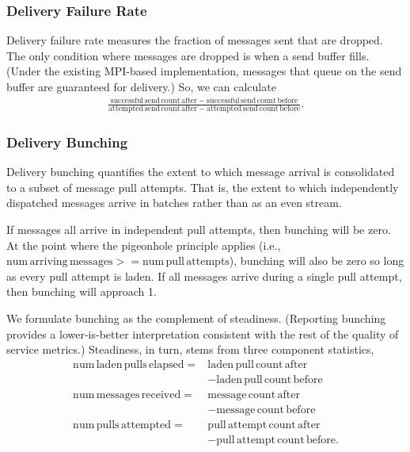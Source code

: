 
\subsubsection{Delivery Failure Rate} \label{moreno:sec:delivery-failure-rate-metric}

Delivery failure rate measures the fraction of messages sent that are dropped.
The only condition where messages are dropped is when a send buffer fills.
(Under the existing MPI-based implementation, messages that queue on the send buffer are guaranteed for delivery.)
So, we can calculate
\begin{align*}
  \frac{
    \mathrm{successful\,send\,count\,after} - \mathrm{successful\,send\,count\,before}
  }{
    \mathrm{attempted\,send\,count\,after} - \mathrm{attempted\,send\,count\,before}
  }.
\end{align*}

\subsubsection{Delivery Bunching} \label{moreno:sec:delivery-bunching-metric}

Delivery bunching quantifies the extent to which message arrival is consolidated to a subset of message pull attempts.
That is, the extent to which independently dispatched messages arrive in batches rather than as an even stream.

If messages all arrive in independent pull attempts, then bunching will be zero.
At the point where the pigeonhole principle applies (i.e., $\mathrm{num\,arriving\,messages} >= \mathrm{num\,pull\,attempts}$), bunching will also be zero so long as every pull attempt is laden.
If all messages arrive during a single pull attempt, then bunching will approach 1.

We formulate bunching as the complement of steadiness.
(Reporting bunching provides a lower-is-better interpretation consistent with the rest of the quality of service metrics.)
Steadiness, in turn, stems from three component statistics,
\begin{align*}
\mathrm{num\,laden\,pulls\,elapsed} =& \mathrm{laden\,pull\,count\,after} \\
  &- \mathrm{laden\,pull\,count\,before} \\
\mathrm{num\,messages\,received} =& \mathrm{message\,count\,after} \\
  &- \mathrm{message\,count\,before} \\
\mathrm{num\,pulls\,attempted} =& \mathrm{pull\,attempt\,count\,after} \\
  &- \mathrm{pull\,attempt\,count\,before}
.
\end{align*}


